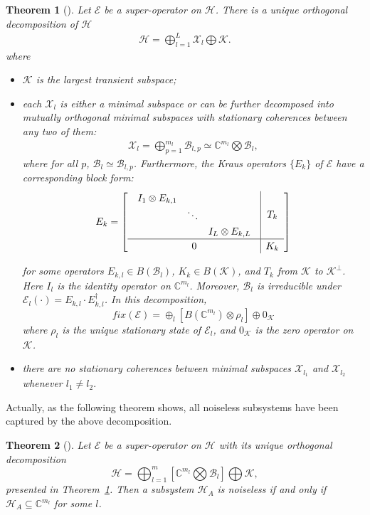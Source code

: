 \documentclass[journal]{IEEEtran}
\def\h{\ensuremath{\mathcal{H}}}
\def\k{\ensuremath{\mathcal{K}}}
\def\x{\ensuremath{\mathcal{X}}}
\def\b{\ensuremath{\mathcal{B}}}
\def\e{\ensuremath{\mathcal{E}}}
\def\k{\mathcal{K}}
\newtheorem{theorem}{Theorem}
\begin{document}
\begin{theorem}[\cite{baumgartner2012structure}]\label{Theo_NS_Dec}
  Let $\e$ be a super-operator on $\h$. There is a unique  orthogonal decomposition of $\h$
  \begin{eqnarray}\label{Eq_NS_dec_unique}
    \h=\bigoplus_{l=1}^{L}\x_l\bigoplus \k.
  \end{eqnarray}
  where \begin{itemize}
    \item[(1)] $\k$ is the largest transient subspace;
    \item[(2)] each $\x_l$ is either a minimal subspace or can be further decomposed into mutually orthogonal minimal subspaces with stationary coherences between any two of them:
    \begin{eqnarray}\label{Eq_NS_dec}
      \x_l=\bigoplus_{p=1}^{m_l}\b_{l,p}\simeq\mathbb{C}^{m_l}\bigotimes \b_l, 
    \end{eqnarray} 
   where for all $p$, $\b_l\simeq \b_{l,p}$. Furthermore, the Kraus operators $\{E_k\}$ of $\e$ have a corresponding block form:
  \begin{eqnarray}\label{Eq_SC_dec_Kraus}
    \renewcommand{\arraystretch}{1.2}
E_k=\left[\begin{array}{c|c}
  \begin{array}{ccc}
  I_{1}\otimes E_{k,1} &  &\\
   & \ddots &\\
   & & I_{L}\otimes E_{k,L}  
  \end{array} & T_k\\
  \hline
0&K_k
\end{array}\right]
  \end{eqnarray}

for some operators $E_{k,l}\in B(\b_l)$, $K_k\in B(\k)$, and $T_k$ from $\k$ to $\k^\perp$. Here  $I_{l}$ is the identity operator on $\mathbb{C}^{m_l}$. Moreover, $\b_l$ is irreducible under $\e_{l}(\cdot)=E_{k,l}\cdot E_{k,l}^\dagger$. In this decomposition, 
$$fix(\e)=\oplus_{l}[B(\mathbb{C}^{m_l})\otimes \rho_{l}]\oplus 0_\k $$
    where $\rho_l$ is the unique stationary state of $\e_{l}$, and $0_\k$ is the zero operator on $\k$.
    \item[(3)] there are no stationary coherences between minimal subspaces $\x_{l_1}$ and $\x_{l_2}$ whenever $l_{1}\neq l_2.$
      \end{itemize}
\end{theorem}

Actually, as the following theorem shows, all noiseless subsystems have been captured by the above decomposition.
\begin{theorem}[\cite{blume2010information}]
  Let $\e$ be a super-operator on $\h$ with its unique orthogonal decomposition
   $$\h=\bigoplus_{l=1}^m\left[\mathbb{C}^{m_l}\bigotimes\b_l\right]\bigoplus\k,$$
   presented in Theorem~\ref{Theo_NS_Dec}. Then
    a subsystem $\h_A$ is noiseless if and only if $\h_A\subseteq \mathbb{C}^{m_l}$ for some $l$.
\end{theorem}
\end{document}
